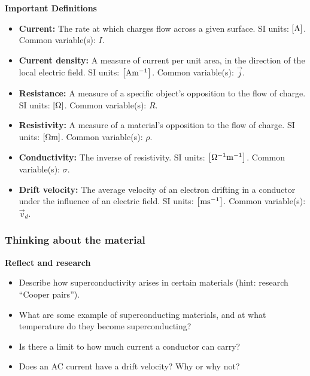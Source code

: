 \begin{framed}
\textbf{Important Definitions}\\
\begin{itemize}
\item \textbf{Current:} The rate at which charges flow across a given surface. SI units: ${\rm \left[{A}\right]}$. Common variable(s): $I$.
\item \textbf{Current density:} A measure of current per unit area, in the direction of the local electric field. SI units: ${\rm \left[{Am^{ -1}}\right]}$. Common variable(s): $\vec j$.
\item \textbf{Resistance:} A measure of a specific object's opposition to the flow of charge. SI units: ${\rm \left[{\Omega}\right]}$. Common variable(s): $R$.
\item \textbf{Resistivity:} A measure of a material's opposition to the flow of charge. SI units: ${\rm \left[{\Omega m}\right]}$. Common variable(s): $\rho$.
\item \textbf{Conductivity:} The inverse of resistivity. SI units: ${\rm \left[{\Omega^{ -1} m^{ -1}}\right]}$. Common variable(s): $\sigma$.
\item \textbf{Drift velocity:} The average velocity of an electron drifting in a conductor under the influence of an electric field. SI units: ${\rm \left[{ms^{ -1}}\right]}$. Common variable(s): $\vec v_{d}$.
\end{itemize}
\end{framed}

\subsubsection{Thinking about the material}

\begin{framed}
\textbf{Reflect and research}\\
\begin{itemize}
\item Describe how superconductivity arises in certain materials (hint: research ``Cooper pairs'').
\item What are some example of superconducting materials, and at what temperature do they become superconducting?
\item Is there a limit to how much current a conductor can carry?
\item Does an AC current have a drift velocity? Why or why not?
\end{itemize}
\end{framed}

